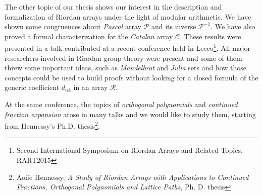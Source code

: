  The other topic of
our thesis shows our interest in the description and formalization of Riordan
arrays under the light of modular arithmetic. We have shown some congruences
about \emph{Pascal} array $\mathcal{P}$ and its inverse $\mathcal{P}^{-1}$. We
have also proved a formal characterization for the \emph{Catalan} array
$\mathcal{C}$. These results were presented in a talk contributed at a recent
conference held in Lecco\footnote{Second International Symposium on Riordan
Arrays and Related Topics, RART$2015$}. All major researchers involved in Riordan group
theory were present and some of them threw some important ideas, such as
\emph{Mandelbrot} and \emph{Julia} sets and how those concepts could be used to
build proofs without looking for a closed formula of the generic coefficient
$d_{nk}$ in an array $\mathcal{R}$.  

At the same conference, the topics of \emph{orthogonal polynomials} and
\emph{continued fraction expansion} arose in many talks and we would like to
study them, starting from Hennessy's Ph.D. thesis\footnote{Aoife Hennessy, \emph{A Study of
Riordan Arrays with Applications to Continued Fractions, Orthogonal Polynomials
and Lattice Paths}, Ph.  D.  thesis}.

